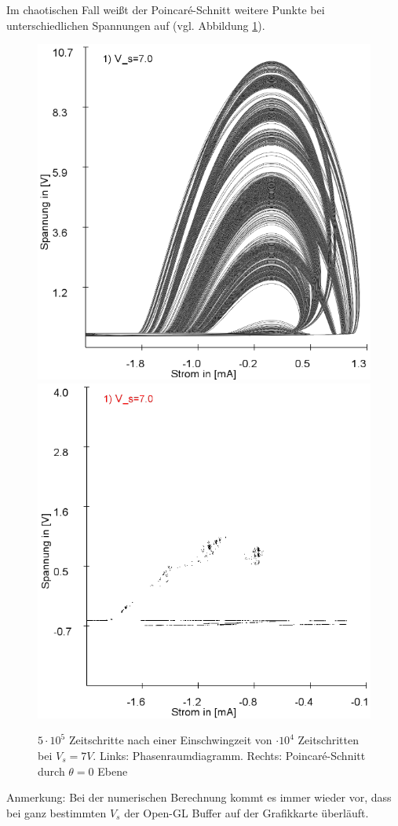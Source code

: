 \documentclass{scrartcl}
\begin{document}
 Im chaotischen Fall weißt der Poincaré-Schnitt weitere Punkte bei unterschiedlichen Spannungen auf (vgl. Abbildung \ref{fig:ldr-poin2}).
\begin{figure}
\includegraphics[scale=0.4]{schwing-500k-nach-10k-7V-phase}
\includegraphics[scale=0.4]{schwing-500k-nach-10k-7V-poin}
\caption{$5\cdot10^5$ Zeitschritte nach einer Einschwingzeit von $\cdot10^4$ Zeitschritten bei $V_s=7V$. Links: Phasenraumdiagramm. Rechts: Poincaré-Schnitt durch $\theta=0$ Ebene}
\label{fig:ldr-poin2}
\end{figure}
Anmerkung: Bei der numerischen Berechnung  kommt es immer wieder vor, dass bei ganz bestimmten $V_s$ der Open-GL Buffer auf der Grafikkarte überläuft.
\end{document}
